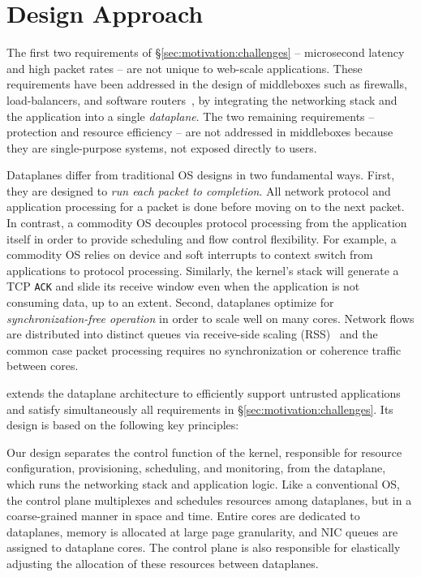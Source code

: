\section{\ix Design Approach}
\label{sec:design}

The first two requirements of \S\ref{sec:motivation:challenges} --
microsecond latency and high packet rates -- are not unique to
web-scale applications.  These requirements have been addressed in the
design of middleboxes such as firewalls, load-balancers, and software
routers~\cite{routebricks,click}, by integrating the networking stack
and the application into a single \emph{dataplane}. The two remaining
requirements -- protection and resource efficiency -- are not
addressed in middleboxes because they are single-purpose systems, not
exposed directly to users.

Dataplanes differ from traditional OS designs in two fundamental
ways. First, they are designed to \emph{run each packet to
  completion}. All network protocol and application processing for a
packet is done before moving on to the next packet.  In contrast, a
commodity OS decouples protocol processing from the application itself
in order to provide scheduling and flow control flexibility.  For
example, a commodity OS relies on device and soft interrupts to
context switch from applications to protocol processing. Similarly,
the kernel's stack will generate a TCP \texttt{ACK} and slide its
receive window even when the application is not consuming data, up to
an extent. Second, dataplanes optimize for \emph{synchronization-free
  operation} in order to scale well on many cores. Network flows are
distributed into distinct queues via receive-side scaling
(RSS)~\cite{url:rss} and the common case packet processing requires no
synchronization or coherence traffic between cores.

\ix extends the dataplane architecture to efficiently support
untrusted applications and satisfy simultaneously all requirements in
\S\ref{sec:motivation:challenges}. Its design is based on the
following key principles: 


 Our
design separates the control function of the kernel, responsible for
resource configuration, provisioning, scheduling, and monitoring, from
the dataplane, which runs the networking stack and application logic.
Like a conventional OS, the control plane multiplexes and schedules
resources among dataplanes, but in a coarse-grained manner in space
and time. Entire cores are dedicated to dataplanes, memory is
allocated at large page granularity, and NIC queues are assigned to
dataplane cores. The control plane is also responsible for elastically
adjusting the allocation of these resources between dataplanes.

